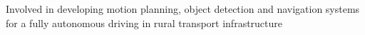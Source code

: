 \begin{cvitemize}
\item Involved in developing motion planning, object detection and navigation systems for a fully autonomous driving in rural transport infrastructure
\end{cvitemize}
